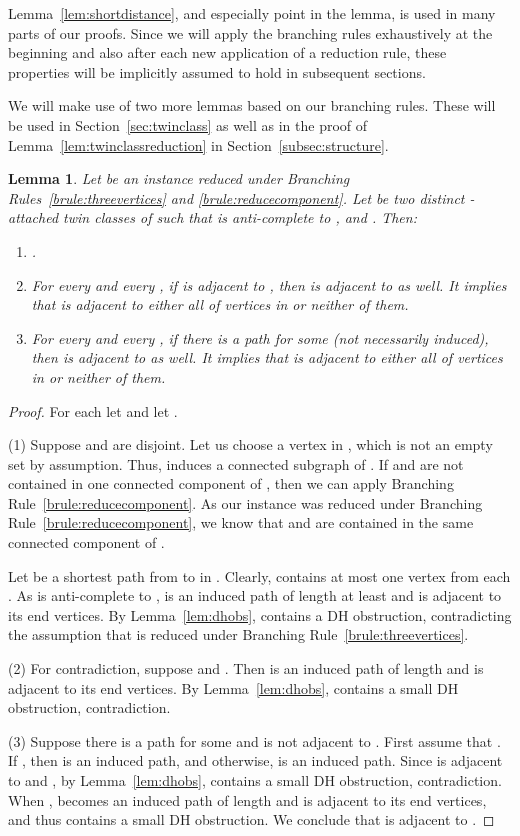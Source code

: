 \documentclass[11pt]{elsarticle}
\newtheorem{lemma}[theorem]{Lemma}
\begin{document}
Lemma~\ref{lem:shortdistance}, and especially point  in the lemma, is used in many parts of our proofs. Since we will apply the branching rules exhaustively at the beginning and also after each new application of a reduction rule, these properties will be implicitly assumed to hold in subsequent sections.

We will make use of two more lemmas based on our branching rules. These
will be used in Section~\ref{sec:twinclass} as well as
in the proof of Lemma~\ref{lem:twinclassreduction} in Section~\ref{subsec:structure}.

\begin{lemma}
 \label{lem:relationt1t2}
Let  be an instance reduced under Branching Rules~\ref{brule:threevertices} and \ref{brule:reducecomponent}.
Let  be two distinct -attached twin classes of  such that  is anti-complete to , and . Then:
\begin{enumerate}[(1)]
\item .
\item For every  and every , 
if  is adjacent to , then  is adjacent to  as well.
It implies that  is adjacent to either all of vertices in  or neither of them.
\item For every  and every , 
if there is a path  for some  (not necessarily induced), then  is adjacent to  as well.
It implies that  is adjacent to either all of vertices in  or neither of them.
\end{enumerate} 
 \end{lemma}
 \begin{proof}
 For each  let  and let .

(1) Suppose  and  are disjoint.
Let us choose a vertex  in , which is not an empty set by assumption.
Thus,  induces a connected subgraph of .
If  and  are not contained in one connected component of ,
then we can apply Branching Rule~\ref{brule:reducecomponent}. 
As our instance was reduced under Branching Rule~\ref{brule:reducecomponent},
we know that  and  are contained in the same connected component of . 

Let  be a shortest path from  to  in .
Clearly,  contains at most one vertex from each .
As  is anti-complete to , 
 is an induced path of length at least  and  is adjacent to its end vertices. 
By Lemma~\ref{lem:dhobs},  contains a DH obstruction, contradicting the assumption that
 is reduced under Branching Rule~\ref{brule:threevertices}. 


(2) For contradiction, suppose  and .  Then  is an induced path of length  and  is adjacent to its end vertices.
By Lemma~\ref{lem:dhobs},  contains a small DH obstruction, contradiction. 

(3) Suppose there is a path  for some  and  is not adjacent to .   
First assume that .
If , then  is an induced path, and
otherwise,  is an induced path.
Since  is adjacent to  and , by Lemma~\ref{lem:dhobs},  contains a small DH obstruction, contradiction. 
When ,  becomes an induced path of length  and  is adjacent to its end vertices, 
and thus  contains a small DH obstruction. We conclude that  is adjacent to .
 \end{proof}
 
\end{document}

